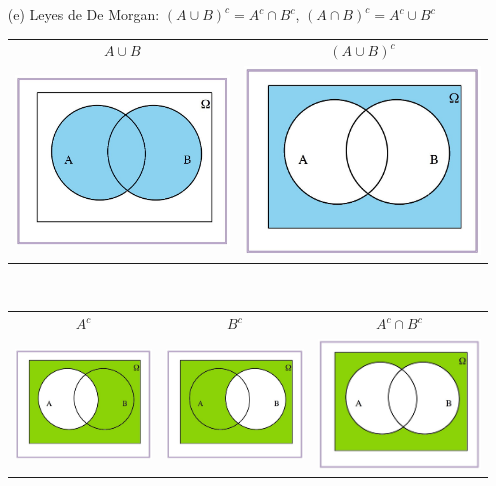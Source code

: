 \documentclass[handout]{beamer}\usepackage[]{graphicx}\usepackage[]{color}
\renewcommand{\emph}[1]{{\color{red}#1}}
\theoremstyle{plain}
\theoremstyle{definition}
\begin{document}
\begin{frame}
\begin{enumerate}
\item[(e)] \emph{Leyes de De Morgan:} $(A\cup B)^c=A^c\cap B^c$, $(A\cap B)^c=A^c\cup B^c$
\medskip
\begin{center}
\begin{tabular}{cc}
\hspace*{-1cm}  $A\cup B$ & $(A\cup B)^c$ \\
\hspace*{-1cm} \includegraphics[width=0.3\linewidth]{demorgan6.jpg} &
\includegraphics[width=0.3\linewidth]{demorgan7.jpg} \end{tabular}\\[2ex]
\begin{tabular}{ccc}
\hspace*{-1cm}  $A^c$ & $B^c$ & $A^c\cap B^c$\\
\hspace*{-1cm} \includegraphics[width=0.3\linewidth]{demorgan8.jpg} &
\includegraphics[width=0.3\linewidth]{demorgan9.jpg} & 
\includegraphics[width=0.3\linewidth]{demorgan10.jpg}
\end{tabular}\\[2ex]


\end{center}
\end{enumerate}
\end{frame}
\end{document}
